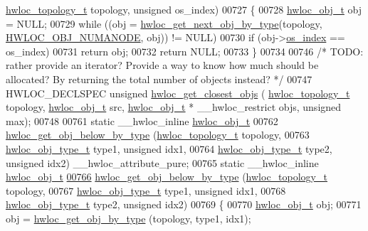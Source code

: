 \begin{DoxyCode}
      \hyperlink{a00186_ga9d1e76ee15a7dee158b786c30b6a6e38}{hwloc\_topology\_t} topology, \textcolor{keywordtype}{unsigned} os\_index)
00727 \{
00728   \hyperlink{a00238}{hwloc\_obj\_t} obj = NULL;
00729   \textcolor{keywordflow}{while} ((obj = \hyperlink{a00187_ga759e88eaf5a230ad283e9d4c42486735}{hwloc\_get\_next\_obj\_by\_type}(topology, 
      \hyperlink{a00184_ggacd37bb612667dc437d66bfb175a8dc55a9d917a3e5497950c6d8948b8e183db5a}{HWLOC\_OBJ\_NUMANODE}, obj)) != NULL)
00730     \textcolor{keywordflow}{if} (obj->\hyperlink{a00238_a61a7a80a68eaccbaaa28269e678c81a9}{os\_index} == os\_index)
00731       \textcolor{keywordflow}{return} obj;
00732   \textcolor{keywordflow}{return} NULL;
00733 \}
00734 
00746 \textcolor{comment}{/* TODO: rather provide an iterator? Provide a way to know how much should be allocated? By returning the
       total number of objects instead? */}
00747 HWLOC\_DECLSPEC \textcolor{keywordtype}{unsigned} \hyperlink{a00200_ga2cd22a34360643f7f5bad09576dec205}{hwloc\_get\_closest\_objs} (
      \hyperlink{a00186_ga9d1e76ee15a7dee158b786c30b6a6e38}{hwloc\_topology\_t} topology, \hyperlink{a00238}{hwloc\_obj\_t} src, 
      \hyperlink{a00238}{hwloc\_obj\_t} * \_\_hwloc\_restrict objs, \textcolor{keywordtype}{unsigned} max);
00748 
00761 \textcolor{keyword}{static} \_\_hwloc\_inline \hyperlink{a00238}{hwloc\_obj\_t}
00762 \hyperlink{a00200_ga7a0c1046851f7a88bd52f5a1d4ba0a97}{hwloc\_get\_obj\_below\_by\_type} (\hyperlink{a00186_ga9d1e76ee15a7dee158b786c30b6a6e38}{hwloc\_topology\_t} topology,
00763                              \hyperlink{a00184_gacd37bb612667dc437d66bfb175a8dc55}{hwloc\_obj\_type\_t} type1, \textcolor{keywordtype}{unsigned} idx1,
00764                              \hyperlink{a00184_gacd37bb612667dc437d66bfb175a8dc55}{hwloc\_obj\_type\_t} type2, \textcolor{keywordtype}{unsigned} idx2) \_\_hwloc\_attribute\_pure;
00765 \textcolor{keyword}{static} \_\_hwloc\_inline \hyperlink{a00238}{hwloc\_obj\_t}
\hyperlink{a00200_ga7a0c1046851f7a88bd52f5a1d4ba0a97}{00766} \hyperlink{a00200_ga7a0c1046851f7a88bd52f5a1d4ba0a97}{hwloc\_get\_obj\_below\_by\_type} (\hyperlink{a00186_ga9d1e76ee15a7dee158b786c30b6a6e38}{hwloc\_topology\_t} topology,
00767                              \hyperlink{a00184_gacd37bb612667dc437d66bfb175a8dc55}{hwloc\_obj\_type\_t} type1, \textcolor{keywordtype}{unsigned} idx1,
00768                              \hyperlink{a00184_gacd37bb612667dc437d66bfb175a8dc55}{hwloc\_obj\_type\_t} type2, \textcolor{keywordtype}{unsigned} idx2)
00769 \{
00770   \hyperlink{a00238}{hwloc\_obj\_t} obj;
00771   obj = \hyperlink{a00187_ga6f414dd80a2b943967a0ac92da3181a2}{hwloc\_get\_obj\_by\_type} (topology, type1, idx1);

\end{DoxyCode}
